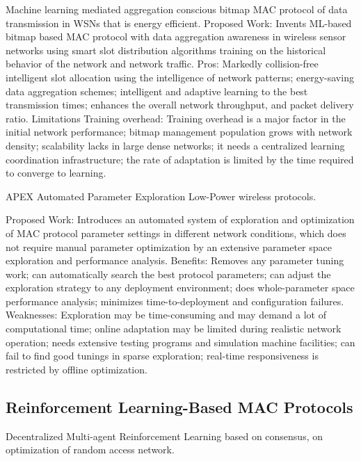 \documentclass[a4paper,fleqn]{cas-dc}
\numberwithin{equation}{section}
\begin{document}
Machine learning mediated aggregation conscious bitmap MAC protocol of data transmission in WSNs that is energy efficient.
Proposed Work: Invents ML-based bitmap based MAC protocol with data aggregation awareness in wireless sensor networks using smart slot distribution algorithms training on the historical behavior of the network and network traffic. Pros: Markedly collision-free intelligent slot allocation using the intelligence of network patterns; energy-saving data aggregation schemes; intelligent and adaptive learning to the best transmission times; enhances the overall network throughput, and packet delivery ratio. Limitations Training overhead: Training overhead is a major factor in the initial network performance; bitmap management population grows with network density; scalability lacks in large dense networks; it needs a centralized learning coordination infrastructure; the rate of adaptation is limited by the time required to converge to learning.\cite{Alanazi2025}


APEX Automated Parameter Exploration Low-Power wireless protocols.

Proposed Work: Introduces an automated system of exploration and optimization of MAC protocol parameter settings in different network conditions, which does not require manual parameter optimization by an extensive parameter space exploration and performance analysis. Benefits: Removes any parameter tuning work; can automatically search the best protocol parameters; can adjust the exploration strategy to any deployment environment; does whole-parameter space performance analysis; minimizes time-to-deployment and configuration failures. Weaknesses: Exploration may be time-consuming and may demand a lot of computational time; online adaptation may be limited during realistic network operation; needs extensive testing programs and simulation machine facilities; can fail to find good tunings in sparse exploration; real-time responsiveness is restricted by offline optimization.\cite{MohamedHydher2025}

\subsection{Reinforcement Learning-Based MAC Protocols}
Decentralized Multi-agent Reinforcement Learning based on consensus, on optimization of random access network.
\end{document}
